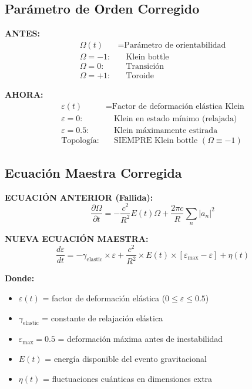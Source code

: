 \documentclass[12pt,a4paper]{article}
\begin{document}
\subsection{Parámetro de Orden Corregido}

\textbf{ANTES:}
\begin{align}
\Omega(t) &= \text{Parámetro de orientabilidad}\\
\Omega = -1: &\quad \text{Klein bottle}\\
\Omega = 0: &\quad \text{Transición}\\
\Omega = +1: &\quad \text{Toroide}
\end{align}

\textbf{AHORA:}
\begin{align}
\varepsilon(t) &= \text{Factor de deformación elástica Klein}\\
\varepsilon = 0: &\quad \text{Klein en estado mínimo (relajada)}\\
\varepsilon = 0.5: &\quad \text{Klein máximamente estirada}\\
\text{Topología:} &\quad \text{SIEMPRE Klein bottle } (\Omega \equiv -1)
\end{align}

\subsection{Ecuación Maestra Corregida}

\textbf{ECUACIÓN ANTERIOR (Fallida):}
\begin{equation}
\frac{\partial\Omega}{\partial t} = -\frac{c^2}{R^2}E(t)\Omega + \frac{2\pi c}{R}\sum_n |a_n|^2
\end{equation}

\textbf{NUEVA ECUACIÓN MAESTRA:}
\begin{equation}
\boxed{
\frac{d\varepsilon}{dt} = -\gamma_{\text{elastic}} \times \varepsilon + \frac{c^2}{R^2} \times E(t) \times [\varepsilon_{\max} - \varepsilon] + \eta(t)
}
\end{equation}

\textbf{Donde:}
\begin{itemize}
\item $\varepsilon(t)$ = factor de deformación elástica ($0 \leq \varepsilon \leq 0.5$)
\item $\gamma_{\text{elastic}}$ = constante de relajación elástica
\item $\varepsilon_{\max} = 0.5$ = deformación máxima antes de inestabilidad
\item $E(t)$ = energía disponible del evento gravitacional
\item $\eta(t)$ = fluctuaciones cuánticas en dimensiones extra
\end{itemize}
\end{document}
